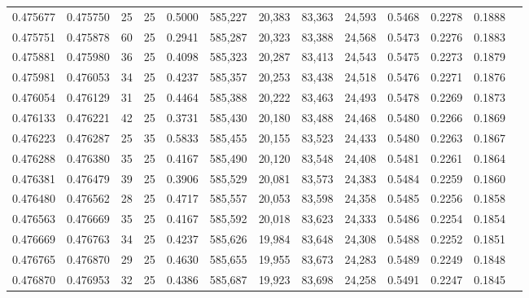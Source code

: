 \begin{tabular}{rrrrrrrrrrrrr}
0.475677 & 0.475750 &    25 &  25 &                                     0.5000 & 585,227 &  20,383 &  83,363 &  24,593 & 0.5468 & 0.2278 & 0.1888 \\
0.475751 & 0.475878 &    60 &  25 &                                     0.2941 & 585,287 &  20,323 &  83,388 &  24,568 & 0.5473 & 0.2276 & 0.1883 \\
0.475881 & 0.475980 &    36 &  25 &                                     0.4098 & 585,323 &  20,287 &  83,413 &  24,543 & 0.5475 & 0.2273 & 0.1879 \\
0.475981 & 0.476053 &    34 &  25 &                                     0.4237 & 585,357 &  20,253 &  83,438 &  24,518 & 0.5476 & 0.2271 & 0.1876 \\
0.476054 & 0.476129 &    31 &  25 &                                     0.4464 & 585,388 &  20,222 &  83,463 &  24,493 & 0.5478 & 0.2269 & 0.1873 \\
0.476133 & 0.476221 &    42 &  25 &                                     0.3731 & 585,430 &  20,180 &  83,488 &  24,468 & 0.5480 & 0.2266 & 0.1869 \\
0.476223 & 0.476287 &    25 &  35 &                                     0.5833 & 585,455 &  20,155 &  83,523 &  24,433 & 0.5480 & 0.2263 & 0.1867 \\
0.476288 & 0.476380 &    35 &  25 &                                     0.4167 & 585,490 &  20,120 &  83,548 &  24,408 & 0.5481 & 0.2261 & 0.1864 \\
0.476381 & 0.476479 &    39 &  25 &                                     0.3906 & 585,529 &  20,081 &  83,573 &  24,383 & 0.5484 & 0.2259 & 0.1860 \\
0.476480 & 0.476562 &    28 &  25 &                                     0.4717 & 585,557 &  20,053 &  83,598 &  24,358 & 0.5485 & 0.2256 & 0.1858 \\
0.476563 & 0.476669 &    35 &  25 &                                     0.4167 & 585,592 &  20,018 &  83,623 &  24,333 & 0.5486 & 0.2254 & 0.1854 \\
0.476669 & 0.476763 &    34 &  25 &                                     0.4237 & 585,626 &  19,984 &  83,648 &  24,308 & 0.5488 & 0.2252 & 0.1851 \\
0.476765 & 0.476870 &    29 &  25 &                                     0.4630 & 585,655 &  19,955 &  83,673 &  24,283 & 0.5489 & 0.2249 & 0.1848 \\
0.476870 & 0.476953 &    32 &  25 &                                     0.4386 & 585,687 &  19,923 &  83,698 &  24,258 & 0.5491 & 0.2247 & 0.1845 \\

\end{tabular}
